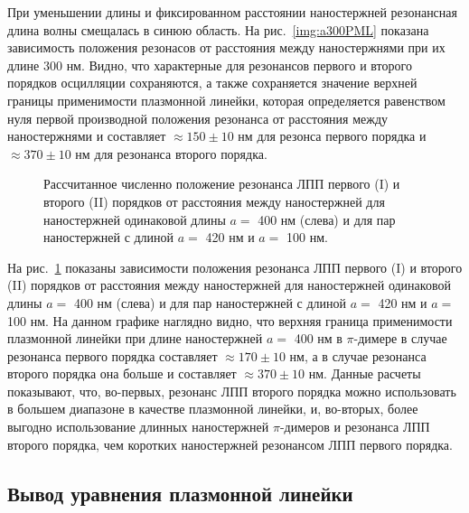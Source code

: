 При уменьшении длины и фиксированном расстоянии наностержней резонансная длина волны смещалась в синюю область. На рис.~\ref{img:a300PML} показана зависимость положения резонасов от расстояния между наностержнями при их длине 300 нм. Видно, что характерные для резонансов первого и второго порядков осцилляции сохраняются, а также сохраняется значение верхней границы применимости плазмонной линейки, которая определяется равенством нуля первой производной положения резонанса от расстояния между наностержнями и составляет  $ \approx 150 \pm 10 $ нм для резонса первого порядка и $ \approx 370 \pm 10 $ нм для резонанса второго порядка.
\begin{figure}
\caption{Рассчитанное численно положение резонанса ЛПП первого (I) и второго (II) порядков от расстояния между наностержней для наностержней одинаковой длины $ a = $ 400 нм (слева) и для пар наностержней с длиной $ a = $ 420 нм и $ a = $ 100 нм.}
\label{img:res_comparison}
\end{figure}

На рис.~\ref{img:res_comparison} показаны зависимости положения резонанса ЛПП первого (I) и второго (II) порядков от расстояния между наностержней для наностержней одинаковой длины $ a = $ 400 нм (слева) и для пар наностержней с длиной $ a = $ 420 нм и $ a = $ 100 нм. На данном графике наглядно видно, что верхняя граница применимости плазмонной линейки при длине наностержней $ a = $ 400 нм в $ \pi $-димере в случае резонанса первого порядка составляет $ \approx 170 \pm 10 $ нм, а в случае резонанса второго порядка она больше и составляет $ \approx 370 \pm 10 $ нм. Данные расчеты показывают, что, во-первых, резонанс ЛПП второго порядка можно использовать в большем диапазоне в качестве плазмонной линейки, и, во-вторых, более выгодно использование длинных наностержней $ \pi $-димеров и резонанса ЛПП второго порядка, чем коротких наностержней резонансом ЛПП первого порядка.


\subsection{Вывод уравнения плазмонной линейки}

